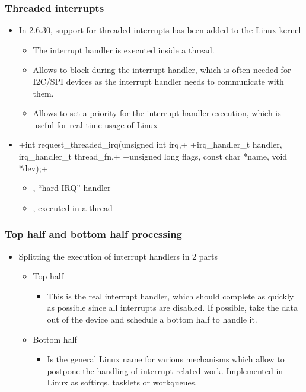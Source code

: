 \begin{frame}[fragile]
  \frametitle{Threaded interrupts}
  \begin{itemize}
  \item In 2.6.30, support for threaded interrupts has been added to
    the Linux kernel
    \begin{itemize}
    \item The interrupt handler is executed inside a thread.
    \item Allows to block during the interrupt handler, which is often
      needed for I2C/SPI devices as the interrupt handler needs to
      communicate with them.
    \item Allows to set a priority for the interrupt handler
      execution, which is useful for real-time usage of Linux
    \end{itemize}
  \item {}+int request_threaded_irq(unsigned int irq,+
    +irq_handler_t handler, irq_handler_t thread_fn,+
    +unsigned long flags, const char *name, void *dev);+
    \begin{itemize}
    \item {}, ``hard IRQ'' handler
    \item {}, executed in a thread
    \end{itemize}
  \end{itemize}
\end{frame}

\begin{frame}
  \frametitle{Top half and bottom half processing}
  \begin{itemize}
  \item Splitting the execution of interrupt handlers in 2 parts
    \begin{itemize}
    \item Top half
      \begin{itemize}
      \item This is the real interrupt handler, which should complete
        as quickly as possible since all interrupts are disabled. If
        possible, take the data out of the device and schedule a
        bottom half to handle it.
      \end{itemize}
    \item Bottom half
      \begin{itemize}
      \item Is the general Linux name for various mechanisms which
        allow to postpone the handling of interrupt-related
        work. Implemented in Linux as softirqs, tasklets or
        workqueues.
      \end{itemize}
    \end{itemize}
  \end{itemize}
\end{frame}

